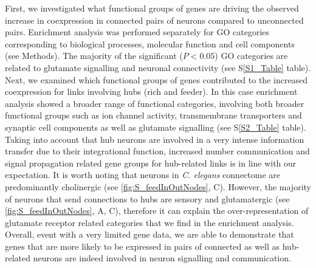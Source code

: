 \documentclass[10pt,letterpaper]{article}
\begin{document}
First, we investigated what functional groups of genes are driving the observed increase in coexpression in connected pairs of neurons compared to unconnected pairs.
Enrichment analysis was performed separately for GO categories corresponding to biological processes, molecular function and cell components (see Methods). 
The majority of the significant ($P < 0.05$) GO categories are related to glutamate signalling and neuronal connectivity (see S\ref{S1_Table} table).\\

Next, we examined which functional groups of genes contributed to the increased coexpression for links involving hubs (rich and feeder). 
In this case enrichment analysis showed a broader range of functional categories, involving both broader functional groups such as ion channel activity, transmembrane transporters and synaptic cell components as well as glutamate signalling (see S\ref{S2_Table} table).
Taking into account that hub neurons are involved in a very intense information transfer due to their integrational function, increased number communication and signal propagation related gene groups for hub-related links is in line with our expectation.
It is worth noting that neurons in \textit{C. elegans} connectome are predominantly cholinergic (see \ref{fig:S_feedInOutNodes}, C). 
However, the majority of neurons that send connections to hubs are sensory and glutamatergic (see \ref{fig:S_feedInOutNodes}, A, C), therefore it can explain the over-representation of glutamate receptor related categories that we find in the enrichment analysis.
Overall, event with a very limited gene data, we are able to demonstrate that genes that are more likely to be expressed in pairs of connected as well as hub-related neurons are indeed involved in neuron signalling and communication. 
\\




\end{document}
